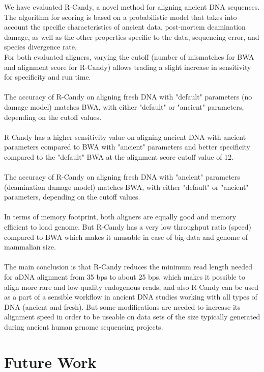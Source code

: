 \documentclass[11pt,a4paper]{report}
\begin{document}
We have evaluated R-Candy, a novel method for aligning ancient DNA sequences.
The algorithm for scoring is based on a probabilistic model that takes into account 
the specific characteristics of ancient data, post-mortem deamination damage, as 
well as the other properties specific to the data, sequencing error, and species
divergence rate. 
\\
For both evaluated aligners, varying the cutoff (number of mismatches for BWA 
and alignment score for R-Candy) allows trading a slight increase in sensitivity 
for specificity and run time.
\\\\
The accuracy of R-Candy on aligning fresh DNA with "default" parameters (no damage model) 
matches BWA, with either "default" or "ancient" parameters, depending  on the cutoff values.
\\\\
R-Candy has a higher sensitivity value on aligning ancient DNA with ancient parameters
compared to BWA with "ancient" parameters and better specificity compared to the 
"default" BWA at the alignment score cutoff value of 12.
\\\\
The accuracy of R-Candy on aligning fresh DNA with "ancient" parameters
(deamination damage model) matches BWA, with either "default" or "ancient" 
parameters, depending  on the cutoff values.
\\\\
In terms of memory footprint, both aligners are equally good and memory efficient
to load genome. But R-Candy has a very low throughput ratio (speed) compared to 
BWA which makes it unusable in case of big-data and genome of mammalian size. 
\\\\
The main conclusion is that R-Candy reduces the minimum read length needed
for aDNA alignment from 35 bps to about 25 bps, which makes it possible to
align more rare and low-quality endogenous reads, and also R-Candy can be 
used as a part of a sensible workflow in ancient DNA studies working with all 
types of DNA (ancient and fresh). But some modifications are needed to 
increase its alignment speed in order to be useable on data sets of the
size typically generated during ancient human genome sequencing projects. 



 

\section{Future Work} \label{Future Work}
\end{document}
